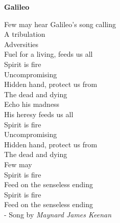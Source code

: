 

\thispagestyle{empty}
\begingroup
\let\clearpage\relax
\let\cleardoublepage\relax
\let\cleardoublepage\relax
\thispagestyle{empty}

\centering
\textbf{Galileo}
\vspace*{3em}

Few may hear Galileo’s song calling\\
A tribulation\\
Adversities\\
Fuel for a living, feeds us all\\[1em]

Spirit is fire\\
Uncompromising\\
Hidden hand, protect us from\\
The dead and dying\\[1em]

Echo his madness\\
His heresy feeds us all\\[1em]

Spirit is fire\\
Uncompromising\\
Hidden hand, protect us from\\
The dead and dying\\[1em]

Few may\\[1em]

Spirit is fire\\
Feed on the senseless ending\\[1em]

Spirit is fire\\
Feed on the senseless ending\\[3em]


- Song by \textit{Maynard James Keenan}

\endgroup 
